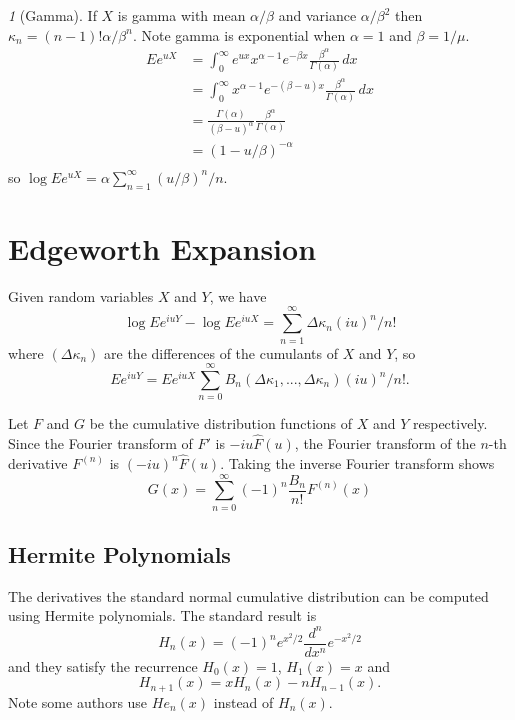 \documentclass[11pt]{article}
\theoremstyle{remark}
\newtheorem*{example}{}
\begin{document}
\begin{example}[Gamma]
If \(X\) is gamma with mean \(\alpha/\beta\) and variance
\(\alpha/\beta^2\) then \(\kappa_n = (n - 1)!\alpha/\beta^n\).
Note gamma is exponential when
\(\alpha = 1\) and \(\beta = 1/\mu\).
\begin{align*}
Ee^{uX} &= \int_0^\infty e^{ux} x^{\alpha-1} e^{-\beta x}
\frac{\beta^\alpha}{\Gamma(\alpha)}\,dx\\
&= \int_0^\infty x^{\alpha-1} e^{-(\beta -u) x}
\frac{\beta^\alpha}{\Gamma(\alpha)}\,dx\\
&= \frac{\Gamma(\alpha)}{(\beta - u)^\alpha} \frac{\beta^\alpha}{\Gamma(\alpha)}\\
&= (1 - u/\beta)^{-\alpha}\\
\end{align*}
so
\(
\log E e^{uX} = \alpha \sum_{n=1}^\infty (u/\beta)^n/n\).


\end{example}

\section{Edgeworth Expansion}
Given random
variables \(X\) and \(Y\), we have
\[\log E e^{iuY} - \log E e^{iuX} = \sum_{n=1}^\infty \Delta\kappa_n (iu)^n/n!\]
where \((\Delta\kappa_n)\) are the differences of the cumulants 
of \(X\) and \(Y\), so
\[
Ee^{iuY} = Ee^{iuX}\sum_{n=0}^\infty B_n(\Delta\kappa_1,...,\Delta\kappa_n)(iu)^n/n!.
\]

Let \(F\) and \(G\) be the cumulative distribution functions of
\(X\) and \(Y\) respectively.
Since the Fourier transform of \(F'\) is \(-iu \hat F(u)\),
the Fourier transform of the \(n\)-th derivative
\(F^{(n)}\) is \((-iu)^n\hat F(u)\).
Taking the inverse Fourier transform shows
\[
G(x) = \sum_{n=0}^\infty (-1)^n \frac{B_n}{n!} F^{(n)}(x)
\]

\subsection{Hermite Polynomials}
The derivatives the standard normal cumulative distribution 
can be computed using Hermite polynomials\cite{?}.
The standard result\cite{?} is
\[
H_n(x) = (-1)^n e^{x^2/2}\frac{d^n}{dx^n}e^{-x^2/2}
\]
and they satisfy the recurrence \(H_0(x) = 1\), \(H_1(x) = x\) and
\[
H_{n+1}(x) = xH_n(x) - n H_{n-1}(x).
\]
Note some authors use \(He_n(x)\) instead of \(H_n(x)\).
\end{document}
